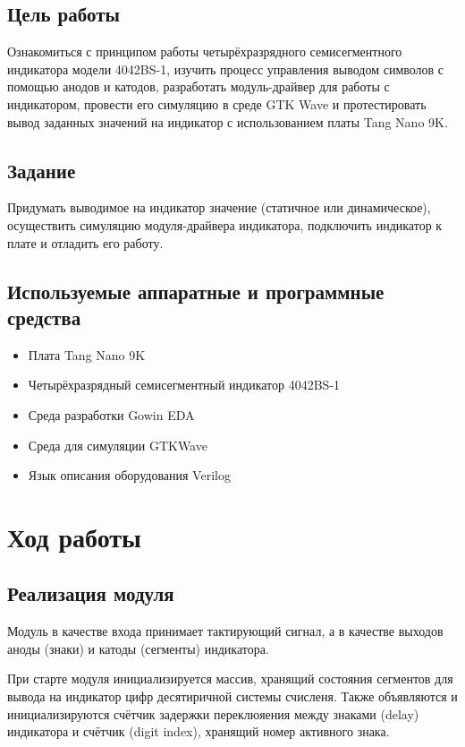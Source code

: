\section*{Цель работы} 

Ознакомиться с принципом работы четырёхразрядного семисегментного индикатора модели 4042BS-1, изучить процесс управления выводом символов с помощью анодов и катодов, разработать модуль-драйвер для работы с индикатором, провести его симуляцию в среде GTK Wave и протестировать вывод заданных значений на индикатор с использованием платы Tang Nano 9K.

\section*{Задание}

Придумать выводимое на индикатор значение (статичное или динамическое),
осуществить симуляцию модуля-драйвера индикатора, подключить индикатор к плате
и отладить его работу.

\section*{Используемые аппаратные и программные средства}
\begin{itemize}
    \item Плата Tang Nano 9K
    \item Четырёхразрядный семисегментный
индикатор 4042BS-1
    \item Среда разработки Gowin EDA
    \item Среда для симуляции GTKWave
    \item Язык описания оборудования Verilog
\end{itemize}

\chapter{Ход работы}

\section{Реализация модуля}

Модуль в качестве входа принимает тактирующий сигнал, а в качестве выходов аноды (знаки) и катоды (сегменты) индикатора.

При старте модуля инициализируется массив, хранящий состояния сегментов для вывода на индикатор цифр десятиричной системы счисленя.
Также объявляются и инициализируются счётчик задержки переклюяения между знаками (delay) индикатора и счётчик (digit index), хранящий номер активного знака.

